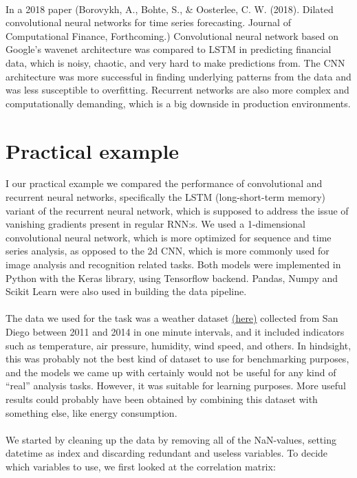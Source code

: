 \documentclass{article}
\begin{document}
  \paragraph{}
  In a 2018 paper (Borovykh, A., Bohte, S., \& Oosterlee, C. W. (2018). Dilated convolutional neural networks for time series forecasting. Journal of Computational Finance, Forthcoming.) Convolutional neural network based on Google’s wavenet architecture was compared to LSTM in predicting financial data, which is noisy, chaotic, and very hard to make predictions from. The CNN architecture was more successful in finding underlying patterns from the data and was less susceptible to overfitting. Recurrent networks are also more complex and computationally demanding, which is a big downside in production environments.
  \newpage
  \section{Practical example}
  I our practical example we compared the performance of convolutional and recurrent neural networks, specifically the LSTM (long-short-term memory) variant of the recurrent neural network, which is supposed to address the issue of vanishing gradients present in regular RNN:s. We used a 1-dimensional convolutional neural network, which is more optimized for sequence and time series analysis, as opposed to the 2d CNN, which is more commonly used for image analysis and recognition related tasks. Both models were implemented in Python with the Keras library, using Tensorflow backend. Pandas, Numpy and Scikit Learn were also used in building the data pipeline. 
  \paragraph{}
  The data we used for the task was a weather dataset \href{https://www.kaggle.com/ktochylin/san-diego-every-minute-weather-indicators-201114}{(here)} collected from San Diego between 2011 and 2014 in one minute intervals, and it included indicators such as temperature, air pressure, humidity, wind speed, and others. In hindsight, this was probably not the best kind of dataset to use for benchmarking purposes, and the models we came up with certainly would not be useful for any kind of “real” analysis tasks. However, it was suitable for learning purposes. More useful results could probably have been obtained by combining this dataset with something else, like energy consumption.
  \paragraph{}
  We started by cleaning up the data by removing all of the NaN-values, setting datetime as index and discarding redundant and useless variables. To decide which variables to use, we first looked at the correlation matrix:
\end{document}
